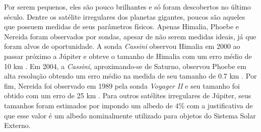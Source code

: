 \documentclass[12pt,a4paper]{report}
\begin{document}
Por serem pequenos, eles são pouco brilhantes e só foram descobertos no último século. Dentre os satélite irregulares dos planetas gigantes, poucos são aqueles que possuem medidas de seus parâmetros físicos. Apenas Himalia, Phoebe e Nereida foram observados por sondas, apesar de não serem medidas ideais, já que foram alvos de oportunidade. A sonda \textit{Cassini} observou Himalia em 2000 ao passar próximo a Júpiter e obteve o tamanho de Himalia com um erro médio de 10 km \citep{Porco2003}. Em 2004, a \textit{Cassini}, aproximando-se de Saturno, observou Phoebe em alta resolução obtendo um erro médio na medida de seu tamanho de 0.7 km \citep{Thomas2010}. Por fim, Nereida foi observado em 1989 pela sonda \textit{Voyager II} e seu tamanho foi obtido com um erro de 25 km \citep{Smith1989}. Para outros satélites irregulares de Júpiter, seus tamanhos foram estimados por \cite{Rettig2001} impondo um albedo de 4\% com a justificativa de que esse valor é um albedo nominalmente utilizado para objetos do Sistema Solar Externo.




\end{document}
